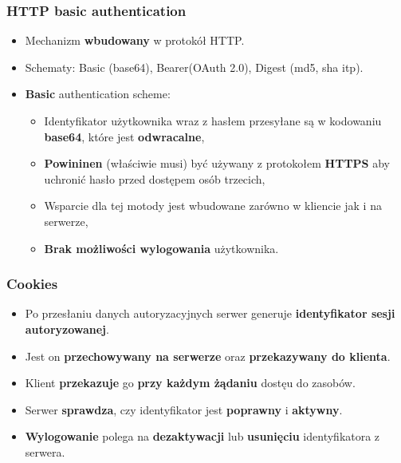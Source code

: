 \documentclass[../main.tex]{subfiles}
\begin{document}
    \subsubsection{HTTP basic authentication}
    \begin{itemize}
        \item Mechanizm \textbf{wbudowany} w protokół HTTP.
        \item Schematy: Basic (base64), Bearer(OAuth 2.0), Digest (md5, sha itp).
        \item \textbf{Basic} authentication scheme:
        \begin{itemize}
            \item Identyfikator użytkownika wraz z hasłem przesyłane są w kodowaniu \textbf{base64}, które jest \textbf{odwracalne},
            \item \textbf{Powininen} (właściwie musi) być używany z protokołem \textbf{HTTPS} aby uchronić hasło przed dostępem osób trzecich,
            \item Wsparcie dla tej motody jest wbudowane zarówno w kliencie jak i na serwerze,
            \item \textbf{Brak możliwości wylogowania} użytkownika.
        \end{itemize}
    \end{itemize}

    \subsubsection{Cookies}
    \begin{itemize}
        \item Po przesłaniu danych autoryzacyjnych serwer generuje \textbf{identyfikator sesji autoryzowanej}.
        \item Jest on \textbf{przechowywany na serwerze} oraz \textbf{przekazywany do klienta}.
        \item Klient \textbf{przekazuje} go \textbf{przy każdym żądaniu} dostęu do zasobów.
        \item Serwer \textbf{sprawdza}, czy identyfikator jest \textbf{poprawny} i \textbf{aktywny}.
        \item \textbf{Wylogowanie} polega na \textbf{dezaktywacji} lub \textbf{usunięciu} identyfikatora z serwera.
    \end{itemize}
\end{document}
